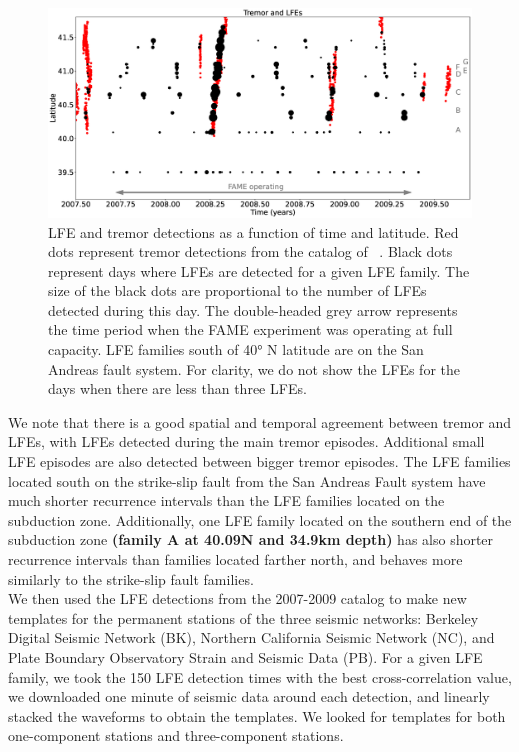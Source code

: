 \documentclass[draft]{agujournal2019}
\begin{document}
\begin{figure}
\noindent\includegraphics[width=\textwidth, trim={0cm 0cm 0cm 0cm},clip]{figures/tremor_nb_FAME_3.eps}
\caption{LFE and tremor detections as a function of time and latitude. Red dots represent tremor detections from the catalog of ~. Black dots represent days where LFEs are detected for a given LFE family. The size of the black dots are proportional to the number of LFEs detected during this day. The double-headed grey arrow represents the time period when the FAME experiment was operating at full capacity. LFE families south of 40° N latitude are on the San Andreas fault system. For clarity, we do not show the LFEs for the days when there are less than three LFEs.}
\label{pngfiguresample}
\end{figure}

We note that there is a good spatial and temporal agreement between tremor and LFEs, with LFEs detected during the main tremor episodes. Additional small LFE episodes are also detected between bigger tremor episodes. The LFE families located south on the strike-slip fault from the San Andreas Fault system have much shorter recurrence intervals than the LFE families located on the subduction zone. Additionally, one LFE family located on the southern end of the subduction zone \textbf{(family A at 40.09N and 34.9km depth)} has also shorter recurrence intervals than families located farther north, and behaves more similarly to the strike-slip fault families. \\

We then used the LFE detections from the 2007-2009 catalog to make new templates for the permanent stations of the three seismic networks: Berkeley Digital Seismic Network (BK), Northern California Seismic Network (NC), and Plate Boundary Observatory Strain and Seismic Data (PB). For a given LFE family, we took the 150 LFE detection times with the best cross-correlation value, we downloaded one minute of seismic data around each detection, and linearly stacked the waveforms to obtain the templates. We looked for templates for both one-component stations and three-component stations. \\
\end{document}
